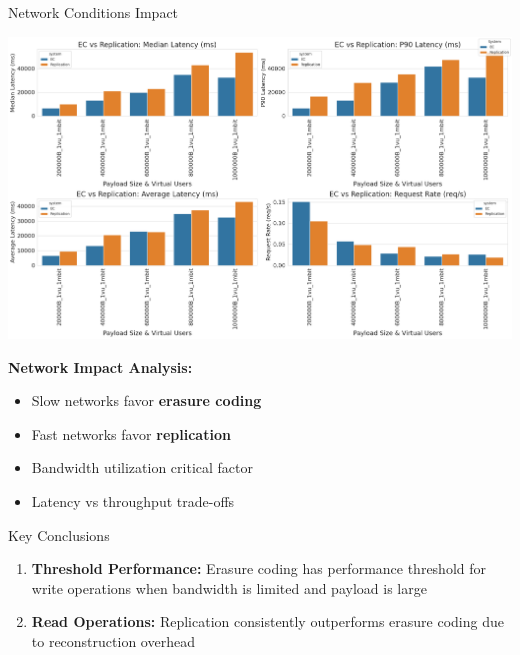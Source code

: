 \documentclass[a0,landscape]{config/poster/a0poster}
\newcommand{\postersection}[1]{%
  \begin{tcolorbox}[
      colback=ITBblue,
      colframe=ITBblue,
      fonttitle=\bfseries,
      coltext=white,
      sharp corners,
      boxrule=0pt,
      top=6pt,
      bottom=6pt,
      halign=center
    ]
    \Large #1
  \end{tcolorbox}%
}
\begin{document}
\begin{multicols}{4}

	\postersection{Network Conditions Impact}
	
	\begin{center}
		\includegraphics[width=0.9\linewidth]{write_bigload_slownet.png}
	\end{center}

	\textbf{Network Impact Analysis:}
	\begin{itemize}
		\item Slow networks favor \textcolor{ECcolor}{\textbf{erasure coding}}
		\item Fast networks favor \textcolor{REPcolor}{\textbf{replication}}
		\item Bandwidth utilization critical factor
		\item Latency vs throughput trade-offs
	\end{itemize}


	\postersection{Key Conclusions}
	
	\begin{enumerate}
		\item \textbf{Threshold Performance:} Erasure coding has performance threshold for write operations when bandwidth is limited and payload is large
		
		\item \textbf{Read Operations:} Replication consistently outperforms erasure coding due to reconstruction overhead
		

\end{enumerate}
\end{multicols}
\end{document}
